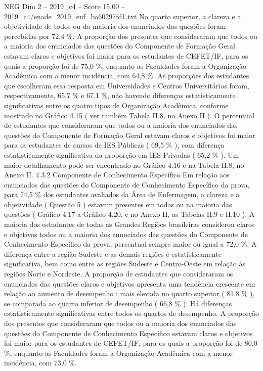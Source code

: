 \begin{textsample}{NEG Dim 2 – 2019\_c4 – Score 15.00 – 2019\_c4/enade\_2019\_enf\_ba60297fd1.txt}
No quarto superior, a clareza e a objetividade de todos ou da maioria dos enunciados das questões foram percebidas por 72,4 \%.
A proporção dos presentes que consideraram que todos ou a maioria dos enunciados das questões do Componente de Formação Geral estavam claros e objetivos foi maior para os estudantes de CEFET/IF, para os quais a proporção foi de 75,0 \%, enquanto as Faculdades foram a Organização Acadêmica com a menor incidência, com 64,8 \%.
As proporções dos estudantes que escolheram essa resposta em Universidades e Centros Universitários foram, respectivamente, 65,7 \% e 67,1 \%, não havendo diferenças estatisticamente significativas entre os quatro tipos de Organização Acadêmica, conforme mostrado no Gráfico 4.15 ( ver também Tabela II.8, no Anexo II ).
O percentual de estudantes que consideraram que todos ou a maioria dos enunciados das questões do Componente de Formação Geral estavam claros e objetivos foi maior para os estudantes de cursos de IES Públicas ( 69,5 \% ), com diferença estatisticamente significativa da proporção em IES Privadas ( 65,2 \% ).
Um maior detalhamento pode ser encontrado no Gráfico 4.16 e na Tabela II.8, no Anexo II. 4.3.2 Componente de Conhecimento Específico Em relação aos enunciados das questões do Componente de Conhecimento Específico da prova, para 74,5 \% dos estudantes avaliados da Área de Enfermagem, a clareza e a objetividade ( Questão 5 ) estavam presentes em todas ou na maioria das questões ( Gráfico 4.17 a Gráfico 4.20, e no Anexo II, as Tabelas II.9 e II.10 ).
A maioria dos estudantes de todas as Grandes Regiões brasileiras considerou claros e objetivos todos ou a maioria dos enunciados das questões do Componente de Conhecimento Específico da prova, percentual sempre maior ou igual a 72,0 \%.
A diferença entre a região Sudeste e as demais regiões é estatisticamente significativa, bem como entre as regiões Sudeste e Centro-Oeste em relação às regiões Norte e Nordeste.
A proporção de estudantes que consideraram os enunciados das questões claros e objetivos apresenta uma tendência crescente em relação ao aumento de desempenho : mais elevada no quarto superior ( 81,8 \% ), se comparada ao quarto inferior de desempenho ( 66,8 \% ).
Há diferenças estatisticamente significativas entre todos os quartos de desempenho.
A proporção dos presentes que consideraram que todos ou a maioria dos enunciados das questões do Componente de Conhecimento Específico estavam claros e objetivos foi maior para os estudantes de CEFET/IF, para os quais a proporção foi de 80,0 \%, enquanto as Faculdades foram a Organização Acadêmica com a menor incidência, com 73,0 \%.

\end{textsample}
